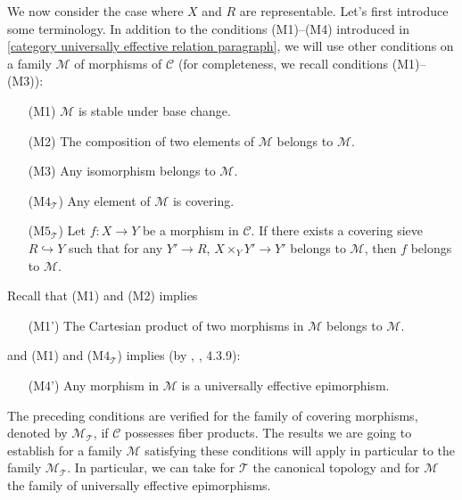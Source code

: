 We now consider the case where $X$ and $R$ are representable. Let's first introduce some terminology. In addition to the conditions (M1)--(M4) introduced in \ref{category universally effective relation paragraph}, we will use other conditions on a family $\mathcal{M}$ of morphisms of $\mathcal{C}$ (for completeness, we recall conditions (M1)--(M3)):
\begin{enumerate}[leftmargin=40pt]
    \item[(M1)] $\mathcal{M}$ is stable under base change.
    \item[(M2)] The composition of two elements of $\mathcal{M}$ belongs to $\mathcal{M}$.
    \item[(M3)] Any isomorphism belongs to $\mathcal{M}$.
    \item[($\text{M4}_\mathcal{T}$)] Any element of $\mathcal{M}$ is covering.
    \item[($\text{M5}_\mathcal{T}$)] Let $f:X\to Y$ be a morphism in $\mathcal{C}$. If there exists a covering sieve $R\hookrightarrow Y$ such that for any $Y'\to R$, $X\times_YY'\to Y'$ belongs to $\mathcal{M}$, then $f$ belongs to $\mathcal{M}$.
\end{enumerate}
Recall that (M1) and (M2) implies
\begin{enumerate}[leftmargin=40pt]
    \item[(M1')] The Cartesian product of two morphisms in $\mathcal{M}$ belongs to $\mathcal{M}$.
\end{enumerate}
and (M1) and ($\text{M4}_\mathcal{T}$) implies (by \cite{SGA3}, , 4.3.9):
\begin{enumerate}[leftmargin=40pt]
    \item[(M4')] Any morphism in $\mathcal{M}$ is a universally effective epimorphism.
\end{enumerate}

The preceding conditions are verified for the family of covering morphisms, denoted by $\mathcal{M}_\mathcal{T}$, if $\mathcal{C}$ possesses fiber products. The results we are going to establish for a family $\mathcal{M}$ satisfying these conditions will apply in particular to the family $\mathcal{M}_\mathcal{T}$. In particular, we can take for $\mathcal{T}$ the canonical topology and for $\mathcal{M}$ the family of universally effective epimorphisms.

